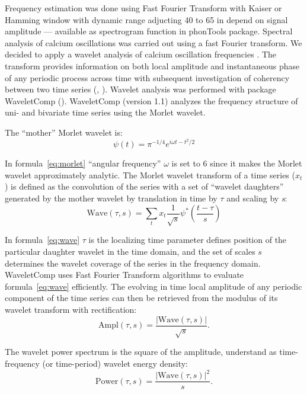 \documentclass{biophys-new}
\begin{document}
Frequency estimation was done using Fast Fourier Transform with Kaiser or Hamming window with dynamic range adjucting 40 to 65 in depend on signal amplitude --- available as spectrogram function in phonTools package.
Spectral analysis of calcium oscillations was carried out using a fast Fourier transform.
We decided to apply a wavelet analysis of calcium oscillation frequencies \cite{addison2018introduction}.
The transform provides information on both local amplitude and instantaneous phase of any periodic process across time with subsequent investigation of coherency between two time series (\cite{grinsted2004application}, \cite{kahraman2016multiple}).
Wavelet analysis was performed with package WaveletComp (\cite{rosch2016waveletcomp}).
WaveletComp (version 1.1) analyzes the frequency structure of uni- and bivariate time series using the Morlet wavelet.

The “mother” Morlet wavelet is:
\begin{equation}\label{eq:morlet}
\psi(t)=\pi^{-1/4}e^{i\omega t-{t^2}/2}
\end{equation}

In formula~\ref{eq:morlet} “angular frequency” $\omega$ is set to 6 since it makes the Morlet wavelet approximately analytic.
The Morlet wavelet transform of a time series (${x}_{t}$) is defined as the convolution of the series with a set of “wavelet daughters” generated by the mother wavelet by translation in time by $\tau$ and scaling by \textit{s}:
\begin{equation}\label{eq:wave}
\text{Wave}(\tau, s)=\sum_{t}x_{t}\frac{1}{\sqrt{s}}\psi^{\ast}\left(\frac{t-\tau}{s}\right)
\end{equation}

In formula~\ref{eq:wave} $\tau$ is the localizing time parameter defines position of the particular daughter wavelet in the time domain, and the set of scales $s$ determines the wavelet coverage of the series in the frequency domain.
WaveletComp uses Fast Fourier Transform algorithms to evaluate formula~\ref{eq:wave} efficiently.
The evolving in time local amplitude of any periodic component of the time series can then be retrieved from the modulus of its wavelet transform with rectification:
\begin{equation}\label{eq:amplitude}
\text{Ampl}(\tau, s)=\frac{|\text{Wave}(\tau, s)|}{\sqrt{s}}.
\end{equation}

The wavelet power spectrum is the square of the amplitude, understand as time-frequency (or time-period) wavelet energy density:
\begin{equation}\label{eq:power}
\text{Power}(\tau, s)=\frac{|\text{Wave}(\tau, s)|^2}{s}.
\end{equation}
\end{document}
